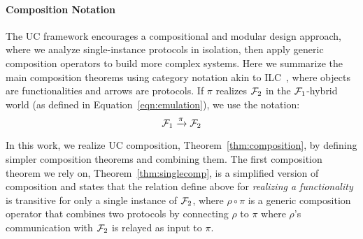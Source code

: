 
\paragraph*{\textbf{Composition Notation}}
The UC framework encourages a compositional and modular design approach,
where we analyze single-instance protocols in isolation, then apply generic composition operators to build more complex systems.
Here we summarize the main composition theorems using category notation akin to ILC~\cite{ilc}, where objects are functionalities and arrows are protocols.
If $\pi$ realizes $\mathcal{F}_2$ in the $\mathcal{F}_1$-hybrid world (as defined in Equation~\ref{eqn:emulation}), we use the notation:
\[
    \mathcal{F}_1 \xrightarrow{\pi} \mathcal{F}_2
\]

In this work, we realize UC composition, Theorem~\ref{thm:composition}, by defining simpler composition theorems and combining them.
The first composition theorem we rely on, Theorem~\ref{thm:singlecomp}, is a simplified version of composition and states that the relation define above for \emph{realizing a functionality} is transitive for only a single instance of $\mathcal{F}_2$, where $\rho \circ \pi$ is a generic composition operator that combines two protocols by connecting $\rho$ to $\pi$ where $\rho$'s communication with $\mathcal{F}_2$ is relayed as input to $\pi$. 

